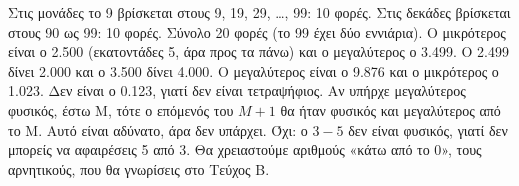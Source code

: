  Στις μονάδες το 9 βρίσκεται στους 9, 19, 29, \dots, 99: 10 φορές. Στις δεκάδες βρίσκεται στους 90 ως 99: 10 φορές. Σύνολο 20 φορές (το 99 έχει δύο εννιάρια).
 Ο μικρότερος είναι ο 2.500 (εκατοντάδες 5, άρα προς τα πάνω) και ο μεγαλύτερος ο 3.499. Ο 2.499 δίνει 2.000 και ο 3.500 δίνει 4.000.
 Ο μεγαλύτερος είναι ο 9.876 και ο μικρότερος ο 1.023. Δεν είναι ο 0.123, γιατί δεν είναι τετραψήφιος.
 Αν υπήρχε μεγαλύτερος φυσικός, έστω Μ, τότε ο επόμενός του $Μ+1$ θα ήταν φυσικός και μεγαλύτερος από το Μ. Αυτό είναι αδύνατο, άρα δεν υπάρχει.
 Όχι: ο $3-5$ δεν είναι φυσικός, γιατί δεν μπορείς να αφαιρέσεις 5 από 3. Θα χρειαστούμε αριθμούς «κάτω από το 0», τους αρνητικούς, που θα γνωρίσεις στο Τεύχος Β.
